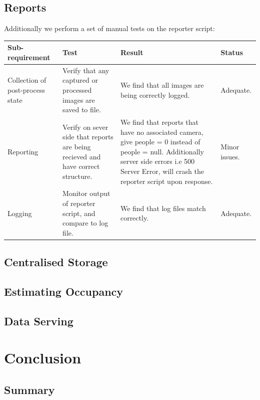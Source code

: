 \documentclass{l4proj}
\begin{document}
\section{Reports}

Additionally we perform a set of manual tests on the reporter script:
\begin{table}
\begin{tabularx}{\textwidth}{|X|X|X|X|}
\hline
\textbf{Sub-requirement} & \textbf{Test} & \textbf{Result} & \textbf{Status}\tabularnewline
\hline
Collection of post-process state  & Verify that any captured or processed images are saved to file. &  We find that all images are being correctly logged. & Adequate. \\
\hline 
Reporting & Verify on sever side that reports are being recieved and have correct structure. & We find that reports that have no associated camera, give people = 0 instead of people = null. Additionally server side errors i.e 500 Server Error, will crash the reporter script upon response. & Minor issues. \\
\hline
Logging & Monitor output of reporter script, and compare to log file. & We find that log files match correctly. & Adequate.\\
\hline
\end{tabularx}
\end{table}


\section{Centralised Storage}
\section{Estimating Occupancy}
\section{Data Serving}


\chapter{Conclusion}
\section{Summary}
\end{document}
